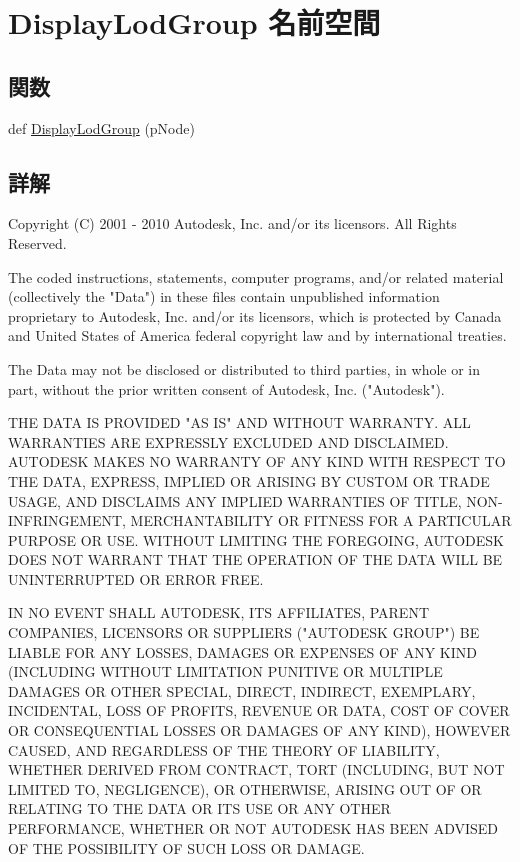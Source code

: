 \hypertarget{namespace_display_lod_group}{}\section{Display\+Lod\+Group 名前空間}
\label{namespace_display_lod_group}
\subsection*{関数}
\begin{DoxyCompactItemize}
\item 
def \hyperlink{namespace_display_lod_group_aa6a425cdad4fc0aa92498e01a751bbc8}{Display\+Lod\+Group} (p\+Node)
\end{DoxyCompactItemize}


\subsection{詳解}
\begin{DoxyVerb} Copyright (C) 2001 - 2010 Autodesk, Inc. and/or its licensors.
 All Rights Reserved.

 The coded instructions, statements, computer programs, and/or related material 
 (collectively the "Data") in these files contain unpublished information 
 proprietary to Autodesk, Inc. and/or its licensors, which is protected by 
 Canada and United States of America federal copyright law and by international 
 treaties. 
 
 The Data may not be disclosed or distributed to third parties, in whole or in
 part, without the prior written consent of Autodesk, Inc. ("Autodesk").

 THE DATA IS PROVIDED "AS IS" AND WITHOUT WARRANTY.
 ALL WARRANTIES ARE EXPRESSLY EXCLUDED AND DISCLAIMED. AUTODESK MAKES NO
 WARRANTY OF ANY KIND WITH RESPECT TO THE DATA, EXPRESS, IMPLIED OR ARISING
 BY CUSTOM OR TRADE USAGE, AND DISCLAIMS ANY IMPLIED WARRANTIES OF TITLE, 
 NON-INFRINGEMENT, MERCHANTABILITY OR FITNESS FOR A PARTICULAR PURPOSE OR USE. 
 WITHOUT LIMITING THE FOREGOING, AUTODESK DOES NOT WARRANT THAT THE OPERATION
 OF THE DATA WILL BE UNINTERRUPTED OR ERROR FREE. 
 
 IN NO EVENT SHALL AUTODESK, ITS AFFILIATES, PARENT COMPANIES, LICENSORS
 OR SUPPLIERS ("AUTODESK GROUP") BE LIABLE FOR ANY LOSSES, DAMAGES OR EXPENSES
 OF ANY KIND (INCLUDING WITHOUT LIMITATION PUNITIVE OR MULTIPLE DAMAGES OR OTHER
 SPECIAL, DIRECT, INDIRECT, EXEMPLARY, INCIDENTAL, LOSS OF PROFITS, REVENUE
 OR DATA, COST OF COVER OR CONSEQUENTIAL LOSSES OR DAMAGES OF ANY KIND),
 HOWEVER CAUSED, AND REGARDLESS OF THE THEORY OF LIABILITY, WHETHER DERIVED
 FROM CONTRACT, TORT (INCLUDING, BUT NOT LIMITED TO, NEGLIGENCE), OR OTHERWISE,
 ARISING OUT OF OR RELATING TO THE DATA OR ITS USE OR ANY OTHER PERFORMANCE,
 WHETHER OR NOT AUTODESK HAS BEEN ADVISED OF THE POSSIBILITY OF SUCH LOSS
 OR DAMAGE. \end{DoxyVerb}
 

